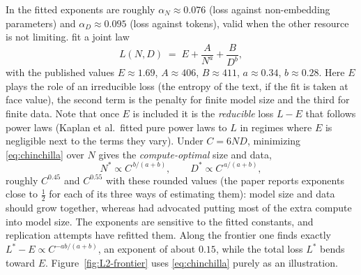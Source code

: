 \begin{beyond}
In \citet{kaplan2020} the fitted exponents are roughly $\alpha_N\approx0.076$ (loss against non-embedding parameters) and $\alpha_D\approx0.095$ (loss against tokens), valid when the other resource is not limiting. \citet{hoffmann2022} fit a joint law
\begin{equation}\label{eq:chinchilla}
  L(N,D)\;=\;E+\frac{A}{N^{a}}+\frac{B}{D^{b}},
\end{equation}
with the published values $E\approx1.69$, $A\approx406$, $B\approx411$, $a\approx0.34$, $b\approx0.28$. Here $E$ plays the role of an irreducible loss (the entropy of the text, if the fit is taken at face value), the second term is the penalty for finite model size and the third for finite data. Note that once $E$ is included it is the \emph{reducible} loss $L-E$ that follows power laws (Kaplan et al.\ fitted pure power laws to $L$ in regimes where $E$ is negligible next to the terms they vary). Under $C=6ND$, minimizing \eqref{eq:chinchilla} over $N$
gives the \emph{compute-optimal} size and data,
\[
  N^*\propto C^{\,b/(a+b)},\qquad D^*\propto C^{\,a/(a+b)},
\]
roughly $C^{0.45}$ and $C^{0.55}$ with these rounded values (the paper reports exponents close to $\tfrac12$ for each of its three ways of estimating them): model size and data should grow together, whereas \citeauthor{kaplan2020} had advocated putting most of the extra compute into model size. The exponents are sensitive to the fitted constants, and replication attempts have refitted them. Along the frontier one finds exactly $L^*-E\propto C^{-ab/(a+b)}$, an exponent of about $0.15$, while the total loss $L^*$ bends toward $E$. Figure~\ref{fig:L2-frontier} uses \eqref{eq:chinchilla} purely as an illustration.
\end{beyond}

